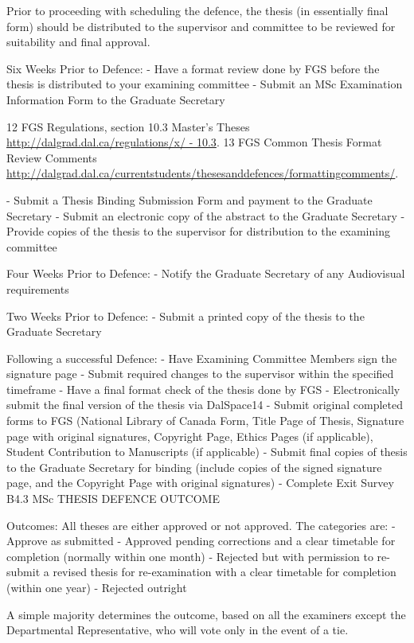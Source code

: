 \documentclass{article}
\newcommand\elink[1]{\url{#1}}
\begin{document}
Prior to proceeding with scheduling the defence, the thesis (in essentially final form) should be distributed to the supervisor and committee to be reviewed for suitability and final approval.

Six Weeks Prior to Defence:
-	Have a format review done by FGS before the thesis is distributed to your examining committee
-	Submit an MSc Examination Information Form to the Graduate Secretary

12 FGS Regulations, section 10.3 Master’s Theses \elink{http://dalgrad.dal.ca/regulations/x/ - 10.3}. 13 FGS Common Thesis Format Review Comments \elink{http://dalgrad.dal.ca/currentstudents/thesesanddefences/formattingcomments/}.
 

-	Submit a Thesis Binding Submission Form and payment to the Graduate Secretary
-	Submit an electronic copy of the abstract to the Graduate Secretary
-	Provide copies of the thesis to the supervisor for distribution to the examining committee

Four Weeks Prior to Defence:
-	Notify the Graduate Secretary of any Audiovisual requirements

Two Weeks Prior to Defence:
-	Submit a printed copy of the thesis to the Graduate Secretary

Following a successful Defence:
-	Have Examining Committee Members sign the signature page
-	Submit required changes to the supervisor within the specified timeframe
-	Have a final format check of the thesis done by FGS
-	Electronically submit the final version of the thesis via DalSpace14
-	Submit original completed forms to FGS (National Library of Canada Form, Title Page of Thesis, Signature page with original signatures, Copyright Page, Ethics Pages (if applicable), Student Contribution to Manuscripts (if applicable)
-	Submit final copies of thesis to the Graduate Secretary for binding (include copies of the signed signature page, and the Copyright Page with original signatures)
-	Complete Exit Survey
B4.3	MSc THESIS DEFENCE OUTCOME

Outcomes: All theses are either approved or not approved. The categories are:
-	Approve as submitted
-	Approved pending corrections and a clear timetable for completion (normally within one month)
-	Rejected but with permission to re-submit a revised thesis for re-examination with a clear timetable for completion (within one year)
-	Rejected outright

A simple majority determines the outcome, based on all the examiners except the Departmental Representative, who will vote only in the event of a tie.
\end{document}
